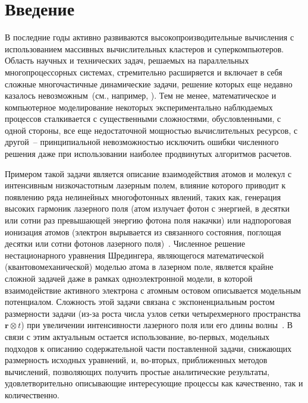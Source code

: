 \documentclass[14pt, a4paper]{article}
\numberwithin{figure}{section}
\numberwithin{equation}{section}
\newcommand{\vr}{\mathbf{r}}
\begin{document}
\tableofcontents

\newpage

\section*{\centering Введение}

В последние годы активно развиваются высокопроизводительные вычисления с использованием массивных вычислительных кластеров и суперкомпьютеров. Область научных и технических задач, решаемых на параллельных многопроцессорных системах, стремительно расширяется и включает в себя сложные многочастичные динамические задачи, решение которых еще недавно казалось невозможным~(см., например, \cite{almanah}). Тем не менее, математическое и компьютерное моделирование некоторых экспериментально наблюдаемых процессов сталкивается с существенными сложностями, обусловленными, с одной стороны, все еще недостаточной мощностью вычислительных ресурсов, с другой~-- принципиальной невозможностью исключить ошибки численного решения даже при использовании наиболее продвинутых алгоритмов расчетов.  

Примером такой задачи является описание взаимодействия атомов и молекул с интенсивным низкочастотным лазерным полем, влияние которого приводит к появлению ряда нелинейных многофотонных явлений, таких как, генерация высоких гармоник лазерного поля (атом излучает фотон с энергией, в десятки или сотни раз превышающей энергию фотона поля накачки) или надпороговая ионизация атомов (электрон вырывается из связанного состояния, поглощая десятки или сотни фотонов лазерного поля)~\cite{SalScience01,ADVBecker2002,MEAdv03}. Численное решение нестационарного уравнения Шредингера, являющегося математической (квантовомеханической) моделью атома в лазерном поле, является крайне сложной задачей даже в рамках одноэлектронной модели, в которой взаимодействие активного электрона с атомным остовом описывается модельным потенциалом. Сложность этой задачи связана с экспоненциальным ростом размерности задачи (из-за роста числа узлов сетки четырехмерного пространства $\vr\otimes t$) при увеличении интенсивности лазерного поля или его длины волны~\cite{parall}. В связи с этим актуальным остается использование, во-первых, модельных подходов к описанию содержательной части поставленной задачи, снижающих размерность исходных уравнений, и, во-вторых, приближенных методов вычислений, позволяющих получить простые аналитические результаты, удовлетворительно описывающие интересующие процессы как качественно, так и количественно.
\end{document}
